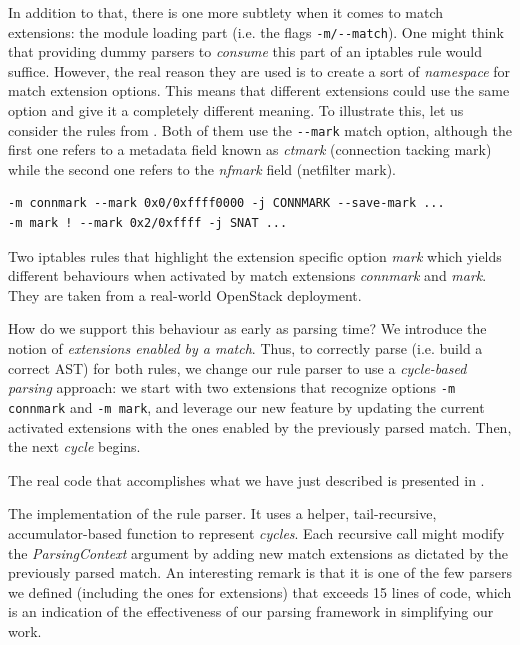 In addition to that, there is one more subtlety when it comes to match
extensions: the module loading part (i.e. the flags \lstinline{-m/--match}).
One might think that providing dummy parsers to \emph{consume} this part of an
iptables rule would suffice.  However, the real reason they are used is to
create a sort of \emph{namespace} for match extension options.  This means that
different extensions could use the same option and give it a completely
different meaning.  To illustrate this, let us consider the rules from
.  Both of them use the
\lstinline{--mark} match option, although the first one refers to a metadata
field known as \emph{ctmark} (connection tacking mark) while the second one
refers to the \emph{nfmark} field (netfilter mark).

\begin{listing}
  \lstset{numbers=none, frame=single, basicstyle=\ttfamily,
    xleftmargin=0.05\textwidth, xrightmargin=0.05\textwidth
  }
  \small
  \begin{lstlisting}
-m connmark --mark 0x0/0xffff0000 -j CONNMARK --save-mark ...
-m mark ! --mark 0x2/0xffff -j SNAT ...
  \end{lstlisting}
  \caption{Two iptables rules that highlight the extension specific option
  \emph{mark} which yields different behaviours when activated by match
  extensions \emph{connmark} and \emph{mark}.  They are taken from a real-world
  OpenStack deployment.}
  \label{lst:namespace-example}
\end{listing}

How do we support this behaviour as early as parsing time?  We introduce the
notion of \emph{extensions enabled by a match}.  Thus, to correctly parse (i.e.
build a correct AST) for both rules, we change our rule parser to use a
\emph{cycle-based parsing} approach: we start with two extensions that
recognize options \lstinline{-m connmark} and \lstinline{-m mark}, and leverage
our new feature by updating the current activated extensions with the ones
enabled by the previously parsed match.  Then, the next \emph{cycle} begins.

The real code that accomplishes what we have just described is presented in
.

\begin{listing}[H]
  \caption{The implementation of the rule parser.  It uses a helper,
  tail-recursive, accumulator-based function to represent \emph{cycles}.  Each
  recursive call might modify the \emph{ParsingContext} argument by adding new
  match extensions as dictated by the previously parsed match.  An interesting
  remark is that it is one of the few parsers we defined (including the ones
  for extensions) that exceeds 15 lines of code, which is an indication of the
  effectiveness of our parsing framework in simplifying our work.}
  \label{lst:rule-parser}
\end{listing}


